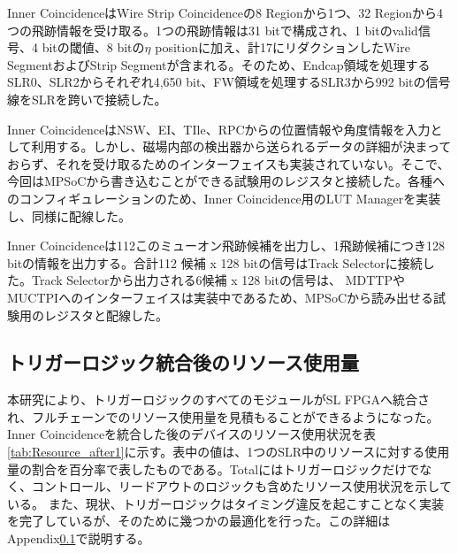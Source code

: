 Inner CoincidenceはWire Strip Coincidenceの8 Regionから1つ、32 Regionから4つの飛跡情報を受け取る。1つの飛跡情報は31 bitで構成され、1 bitのvalid信号、4 bitの\pt 閾値、8 bitの$\eta$ positionに加え、計17にリダクションしたWire SegmentおよびStrip Segmentが含まれる。そのため、Endcap領域を処理するSLR0、SLR2からそれぞれ4,650 bit、FW領域を処理するSLR3から992 bitの信号線をSLRを跨いで接続した。

Inner CoincidenceはNSW、EI、TIle、RPCからの位置情報や角度情報を入力として利用する。しかし、磁場内部の検出器から送られるデータの詳細が決まっておらず、それを受け取るためのインターフェイスも実装されていない。そこで、今回はMPSoCから書き込むことができる試験用のレジスタと接続した。各種へのコンフィギュレーションのため、Inner Coincidence用のLUT Managerを実装し、同様に配線した。

Inner Coincidenceは112このミューオン飛跡候補を出力し、1飛跡候補につき128 bitの情報を出力する。合計112 候補 x 128 bitの信号はTrack Selectorに接続した。Track Selectorから出力される6候補 x 128 bitの信号は、 MDTTPやMUCTPIへのインターフェイスは実装中であるため、MPSoCから読み出せる試験用のレジスタと配線した。

\subsection{トリガーロジック統合後のリソース使用量}

本研究により、トリガーロジックのすべてのモジュールがSL FPGAへ統合され、フルチェーンでのリソース使用量を見積もることができるようになった。
Inner Coincidenceを統合した後のデバイスのリソース使用状況を表\ref{tab:Resource_after1}に示す。表中の値は、1つのSLR中のリソースに対する使用量の割合を百分率で表したものである。Totalにはトリガーロジックだけでなく、コントロール、リードアウトのロジックも含めたリソース使用状況を示している。
また、現状、トリガーロジックはタイミング違反を起こすことなく実装を完了しているが、そのために幾つかの最適化を行った。この詳細はAppendix\ref{}で説明する。

